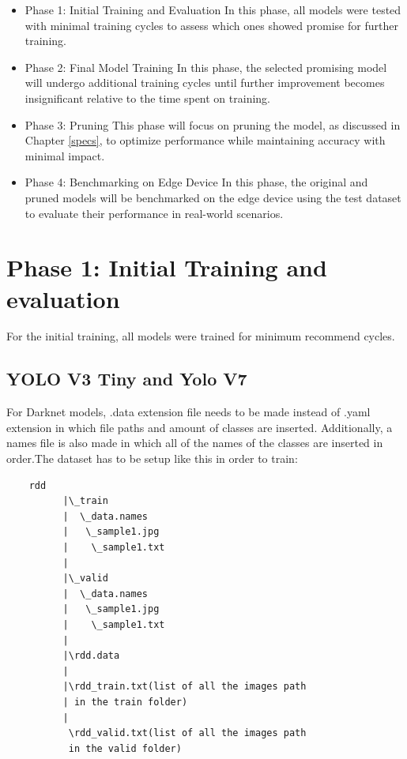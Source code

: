 \begin{itemize}  
    \item Phase 1: Initial Training and Evaluation  
    \subitem \noindent In this phase, all models were tested with minimal training cycles to assess which ones showed promise for further training. 
      
    \item Phase 2: Final Model Training  
    \subitem \noindent In this phase, the selected promising model will undergo additional training cycles until further improvement becomes insignificant relative to the time spent on training.  
    
    \item Phase 3: Pruning  
    \subitem \noindent This phase will focus on pruning the model, as discussed in Chapter \ref{specs}, to optimize performance while maintaining accuracy with minimal impact.  
    
    \item Phase 4: Benchmarking on Edge Device  
    \subitem \noindent In this phase, the original and pruned models will be benchmarked on the edge device using the test dataset to evaluate their performance in real-world scenarios.  
\end{itemize}




\section{Phase 1: Initial Training and evaluation}

For the initial training, all models were trained for minimum recommend cycles.

\subsection{YOLO V3 Tiny and Yolo V7}
For Darknet models, .data extension file needs to be made instead of .yaml extension  in which file paths and amount of classes are inserted. Additionally, a names file is also made in which all of the names of the classes are inserted in order.The dataset has to be setup like this in order to train:

\begin{verbatim}
    rdd
          |\_train
          |  \_data.names
          |   \_sample1.jpg
          |    \_sample1.txt
          |          
          |\_valid
          |  \_data.names
          |   \_sample1.jpg
          |    \_sample1.txt
          |
          |\rdd.data
          |
          |\rdd_train.txt(list of all the images path
          | in the train folder)
          |
           \rdd_valid.txt(list of all the images path 
           in the valid folder)
\end{verbatim}

